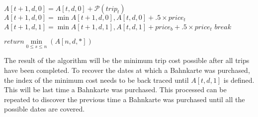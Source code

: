 \documentclass[12pt]{article}
\begin{document}
\begin{algorithm}[H]
\\
{
{
    {
        $A[t+1,d, 0] = A[t,d,0] + \mathcal{P}(trip_t)$\\
        
        {       
            {
                {
                    $A[t+1,d,0] = \min{A[t+1,d,0], A[t,d,0] +.5\times price_t}$
                }
                \Else
                {
                    $A[t+1,d,1] = \min{A[t+1,d,1], A[t,d,1] + price_b +.5\times price_t}$
                }
                $break$
            }
        }                           
        
    }
}
}
{$return \min\limits_{0 \leq s \leq n}(A[n, d, *])$}
\end{algorithm}
The result of the algorithm will be the minimum trip cost possible after
all trips have been completed.  To recover the dates at which a Bahnkarte
was purchased, the index of the minimum cost needs to be back traced
until $A[t,d,1]$ is defined.  This will be last time a Bahnkarte was 
purchased.  This processed can be repeated to discover the previous 
time a Bahnkarte was purchased until all the possible dates are covered.  
\end{document}
